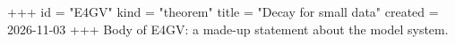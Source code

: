 +++
id = "E4GV"
kind = "theorem"
title = "Decay for small data"
created = 2026-11-03
+++
Body of E4GV: a made-up statement about the model system.
